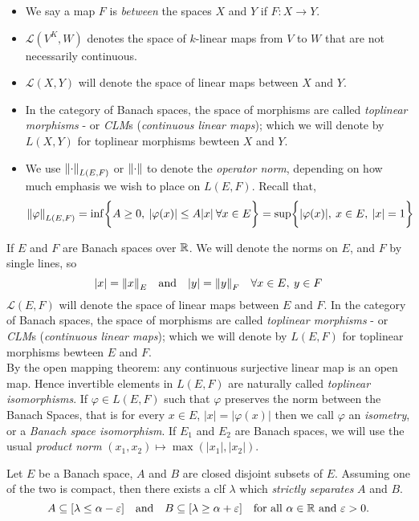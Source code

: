 \documentclass[../main-v2-manifolds.tex]{subfiles}
\begin{document}
\begin{itemize}
    \item We say a map $F$ is \emph{between} the spaces $X$ and $Y$ if $F: X\to Y$. 
    \item $\mathcal{L}(V^K,W)$ denotes the space of $k$-linear maps from $V$ to $W$ that are not    necessarily continuous. 
    \item $\mathcal{L}(X,Y)$ will denote the space of linear maps between $X$ and $Y$. 
    \item In the category of Banach spaces, the space of morphisms are called \emph{toplinear morphisms} - or \emph{CLM}s (\emph{continuous linear maps}); which we will denote by $L(X,Y)$ for toplinear morphisms bewteen $X$ and $Y$.
    \item We use $\norm{\cdot}_{L(E,F)}$ or $\norm{\cdot}$ to denote the \emph{operator norm}, depending on how much emphasis we wish to place on $L(E,F)$. Recall that,
    \[\norm{\varphi}_{L(E,F)} = \inf\biggl\{{A\geq 0,\: \vert {\varphi(x)} \vert\leq A\vert {x} \vert\:\forall x\in E}\biggr\} = \sup\biggl\{{\vert {\varphi(x)} \vert,\: x\in E,\: \vert {x} \vert=1}\biggr\}\]
\end{itemize}


If $E$ and $F$ are Banach spaces over $\mathbb{R}$. We will denote the norms on $E$, and $F$ by single lines, so 
\[
    \vert x\vert = \norm{x}_E \qqtext{and} \vert y\vert = \norm{y}_F\quad\forall x\in E,\: y\in F
\]
$\mathcal{L}(E,F)$ will denote the space of linear maps between $E$ and $F$. In the category of Banach spaces, the space of morphisms are called \emph{toplinear morphisms} - or \emph{CLM}s (\emph{continuous linear maps}); which we will denote by $L(E,F)$ for toplinear morphisms bewteen $E$ and $F$. \\


By the open mapping theorem: any continuous surjective linear map is an open map. Hence invertible elements in $L(E,F)$ are naturally called \emph{toplinear isomorphisms}. If $\varphi\in L(E,F)$ such that $\varphi$ preserves the norm between the Banach Spaces, that is for every $x\in E$, $\vert x\vert = \vert \varphi(x)\vert$ then we call $\varphi$ an \emph{isometry}, or a \emph{Banach space isomorphism}. If $E_1$ and $E_2$ are Banach spaces, we will use the usual \emph{product norm} $(x_1, x_2)\mapsto \max(\vert x_1\vert,\vert x_2\vert)$. 

\begin{wts}\label{prop:hahn-banach-geometric-form}
    Let $E$ be a Banach space, $A$ and $B$ are closed disjoint subsets of $E$. Assuming one of the two is compact, then there exists a clf $\lambda$ which \emph{strictly separates} $A$ and $B$. 
    \begin{equation}\label{eq:hahn-banach-geometric-form}
        A\subseteq [\lambda \leq \alpha-\varepsilon]\qqtext{and} B\subseteq [\lambda\geq\alpha + \varepsilon]\quad\text{for all }\alpha\in\real \text{ and } \varepsilon>0.
    \end{equation}
\end{wts}
\end{document}
